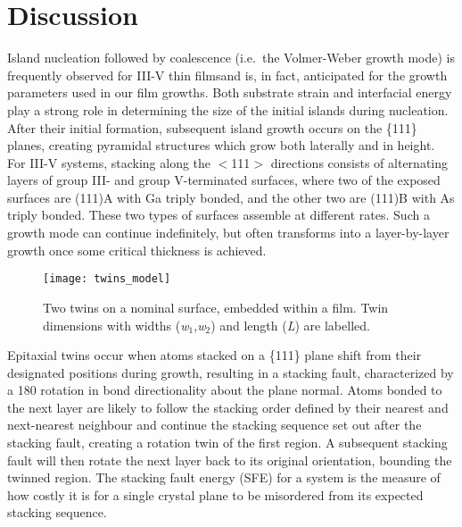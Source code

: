 \section{Discussion}
Island nucleation followed by coalescence (i.e.\ the Volmer-Weber growth mode) is frequently observed for III-V thin films\cite{Ernst1989,Fang1990,Kim2010,Akahane2004}and is, in fact, anticipated for the growth parameters used in our film growths. Both substrate strain and interfacial energy play a strong role in determining the size of the initial islands during nucleation. After their initial formation, subsequent island growth occurs on the \{111\} planes, creating pyramidal structures which grow both laterally and in height. For III-V systems, stacking along the $<$111$>$ directions consists of alternating layers of group III- and group V-terminated surfaces, where two of the exposed surfaces are (111)A with Ga triply bonded, and the other two are (111)B with As triply bonded. These two types of surfaces assemble at different rates. Such a growth mode can continue indefinitely, but often transforms into a layer-by-layer growth once some critical thickness is achieved\cite{Tersoff1994}.
\begin{figure}
    \centering
    \texttt{[image: twins\_model]}
    \caption[Model of twins on a (100) surface]{\label{fig:twins_model}Two twins on a nominal surface, embedded within a film. Twin dimensions with widths (\textit{w}$_1$,\textit{w}$_2$) and length (\textit{L}) are labelled.}
\end{figure}
Epitaxial twins occur when atoms stacked on a \{111\} plane shift from their designated positions during growth, resulting in a stacking fault, characterized by a 180\degree{} rotation in bond directionality about the plane normal. Atoms bonded to the next layer are likely to follow the stacking order defined by their nearest and next-nearest neighbour and continue the stacking sequence set out after the stacking fault, creating a rotation twin of the first region. A subsequent stacking fault will then rotate the next layer back to its original orientation, bounding the twinned region. The stacking fault energy (SFE) for a system is the measure of how costly it is for a single crystal plane to be misordered from its expected stacking sequence.


